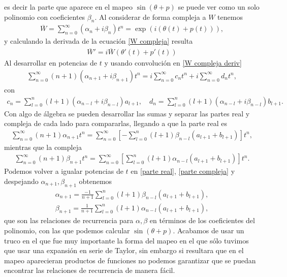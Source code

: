 es decir la parte que aparece en el mapeo $\sin(\theta+p)$ se puede ver como un solo polinomio con coeficientes $\beta_{n}$. Al considerar de forma compleja a $W$ tenemos
\begin{eqnarray}
\overline{W}=\sum_{n=0}^{\infty}(\alpha_{n}+i\beta_{n})t^{n}=\exp(i(\theta(t)+p(t))),
\label{W compleja}
\end{eqnarray}
y calculando la derivada de la ecuación \ref{W compleja} resulta
\begin{eqnarray}
\overline{W}'=i\overline{W}(\theta '(t)+p'(t))
\label{W compleja deriv}
\end{eqnarray}
Al desarrollar en potencias de $t$ y usando convolución en \ref{W compleja deriv}
\begin{eqnarray}
\sum_{n=0}^{\infty}(n+1)(\alpha_{n+1}+i\beta_{n+1})t^{n}=i\sum_{n=0}^{\infty}c_{n}t^{n}+i\sum_{n=0}^{\infty}d_{n}t^{n},
\end{eqnarray}
con
\begin{eqnarray}
c_{n}=\sum_{l=0}^{n}(l+1)(\alpha_{n-l}+i\beta_{n-l})a_{l+1}, \quad
d_{n}=\sum_{l=0}^{n}(l+1)(\alpha_{n-l}+i\beta_{n-l})b_{l+1}.
\end{eqnarray}
Con algo de álgebra se pueden desarrollar las sumas y separar las partes real y compleja de cada lado para compararlas, llegando a que la parte real es
\begin{eqnarray}
\sum_{n=0}^{\infty}(n+1)\alpha_{n+1}t^{n}=\sum_{n=0}^{\infty}\left[-\sum_{l=0}^{n}(l+1)\beta_{n-l}(a_{l+1}+b_{l+1})\right]t^{n},
\label{parte real}
\end{eqnarray}
mientras que la compleja
\begin{eqnarray}
\sum_{n=0}^{\infty}(n+1)\beta_{n+1}t^{n}=\sum_{n=0}^{\infty}\left[\sum_{l=0}^{n}(l+1)\alpha_{n-l}(a_{l+1}+b_{l+1})\right]t^{n}.
\label{parte compleja}
\end{eqnarray}
Podemos volver a igualar potencias de $t$ en \ref{parte real}, \ref{parte compleja} y despejando $\alpha_{n+1},\beta_{n+1}$ obtenemos
\begin{eqnarray}
\alpha_{n+1}=\frac{-1}{n+1}\sum_{l=0}^{n}(l+1)\beta_{n-l}(a_{l+1}+b_{l+1}),
\label{recurrencia alpha}
\end{eqnarray}
\begin{eqnarray}
\beta_{n+1}=\frac{1}{n+1}\sum_{l=0}^{n}(l+1)\alpha_{n-l}(a_{l+1}+b_{l+1}),
\label{recurrencia beta}
\end{eqnarray}
que son las relaciones de recurrencia para $\alpha,\beta$ en términos de los coeficientes del polinomio, con las que podemos calcular $\sin(\theta+p)$. Acabamos de usar un truco en el que fue muy importante la forma del mapeo en el que sólo tuvimos que usar una expansión en serie de Taylor, sin embargo si resultara que en el mapeo aparecieran productos de funciones no podemos garantizar que se puedan encontrar las relaciones de recurrencia de manera fácil. \\


